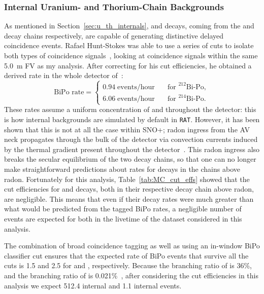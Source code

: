 \subsubsection{Internal Uranium- and Thorium-Chain Backgrounds}
As mentioned in Section~\ref{sec:u_th_internals},  and  decays, coming from the  and  decay chains respectively, are capable of generating distinctive delayed coincidence events. Rafael Hunt-Stokes was able to use a series of cuts to isolate both types of coincidence signals~\cite{hunt-stokesUraniumThoriumBackground2022}, %
looking at coincidence signals within the same \SI{5.0}{\m} FV as my analysis. After correcting for his cut efficiencies, he obtained a derived rate in the whole detector of~\cite{hunt-stokesPrivateCommunication2023}: %
\begin{equation*}
    \text{BiPo rate} = 
    \begin{cases}
        0.94\; \text{events/hour} & \quad \text{for } ^{212}\text{Bi-Po},\\
        6.06\; \text{events/hour} & \quad \text{for } ^{214}\text{Bi-Po}.
    \end{cases}
\end{equation*}
These rates assume a uniform concentration of  and  throughout the detector: this is how internal backgrounds are simulated by default in \texttt{RAT}. However, it has been shown that this is not at all the case within SNO+; radon ingress from the AV neck propagates through the bulk of the detector via convection currents induced by the thermal gradient present throughout the detector~\cite{wilsonThermallydrivenScintillatorFlow2023}. %
This radon ingress also breaks the secular equilibrium of the two decay chains, so that one can no longer make straightforward predictions about rates for decays in the chains above radon. Fortunately for this analysis, Table~\ref{tab:MC_cut_effs} showed that the cut efficiencies for  and  decays, both in their respective decay chain above radon, are negligible. This means that even if their decay rates were much greater than what would be predicted from the tagged BiPo rates, a negligible number of events are expected for both in the livetime of the dataset considered in this analysis.

The combination of broad coincidence tagging as well as using an in-window BiPo classifier cut ensures that the expected rate of BiPo events that survive all the cuts is 1.5 and 2.5 for  and , respectively. Because the branching ratio of  is 36\%, and the branching ratio of  is 0.021\%~\cite{martinNuclearDataSheets2007,shamsuzzohabasuniaNuclearDataSheets2014}, %
after considering the cut efficiencies in this analysis we expect 512.4 internal  and 1.1 internal  events.

